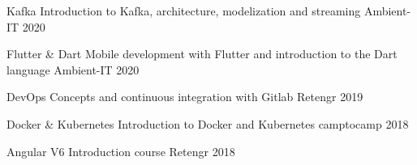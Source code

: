 


\begin{cvhonors}


\cvhonor
{Kafka} %
{Introduction to Kafka, architecture, modelization and streaming} %
{Ambient-IT} %
{2020} %


\cvhonor
{Flutter \& Dart} %
{Mobile development with Flutter and introduction to the Dart language} %
{Ambient-IT} %
{2020} %


\cvhonor
{DevOps} %
{Concepts and continuous integration with Gitlab} %
{Retengr} %
{2019} %


\cvhonor
{Docker \& Kubernetes} %
{Introduction to Docker and Kubernetes} %
{camptocamp} %
{2018} %


\cvhonor
{Angular V6} %
{Introduction course} %
{Retengr} %
{2018} %


\end{cvhonors}
